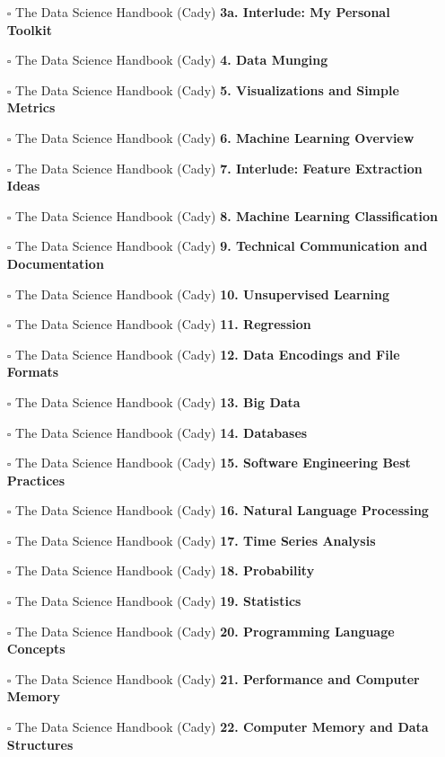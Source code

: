 \documentclass[a4, landscape, 12pt]{article}
\newcommand{\checkbox}{$\square$}%
\begin{document}
\begin{itemize}
{}
\item [\checkbox]  The Data Science Handbook (Cady) \textbf{ 3a. Interlude: My Personal Toolkit
}
\item [\checkbox]  The Data Science Handbook (Cady) \textbf{ 4. Data Munging
}
\item [\checkbox]  The Data Science Handbook (Cady) \textbf{ 5. Visualizations and Simple Metrics
}
\item [\checkbox]  The Data Science Handbook (Cady) \textbf{ 6. Machine Learning Overview
}
\item [\checkbox]  The Data Science Handbook (Cady) \textbf{ 7. Interlude: Feature Extraction Ideas
}
\item [\checkbox]  The Data Science Handbook (Cady) \textbf{ 8. Machine Learning Classification
}
\item [\checkbox]  The Data Science Handbook (Cady) \textbf{ 9. Technical Communication and Documentation
}
\item [\checkbox]  The Data Science Handbook (Cady) \textbf{ 10. Unsupervised Learning
}
\item [\checkbox]  The Data Science Handbook (Cady) \textbf{ 11. Regression
}
\item [\checkbox]  The Data Science Handbook (Cady) \textbf{ 12. Data Encodings and File Formats
}
\item [\checkbox]  The Data Science Handbook (Cady) \textbf{ 13. Big Data
}
\item [\checkbox]  The Data Science Handbook (Cady) \textbf{ 14. Databases
}
\item [\checkbox]  The Data Science Handbook (Cady) \textbf{ 15. Software Engineering Best Practices
}
\item [\checkbox]  The Data Science Handbook (Cady) \textbf{ 16. Natural Language Processing
}
\item [\checkbox]  The Data Science Handbook (Cady) \textbf{ 17. Time Series Analysis
}
\item [\checkbox]  The Data Science Handbook (Cady) \textbf{ 18. Probability
}
\item [\checkbox]  The Data Science Handbook (Cady) \textbf{ 19. Statistics
}
\item [\checkbox]  The Data Science Handbook (Cady) \textbf{ 20. Programming Language Concepts
}
\item [\checkbox]  The Data Science Handbook (Cady) \textbf{ 21. Performance and Computer Memory
}
\item [\checkbox]  The Data Science Handbook (Cady) \textbf{ 22. Computer Memory and Data Structures
}
\end{itemize}
\end{document}
